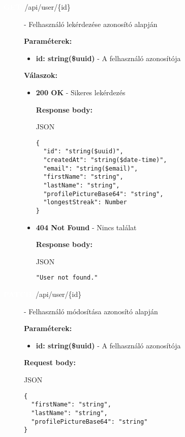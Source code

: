 \documentclass[12pt]{report}
\newcommand{\httpGet}[1]{\colorbox{getColor}{\textbf{\textcolor{white}{GET}}}~#1}
\newcommand{\httpPatch}[1]{\colorbox{patchColor}{\textbf{\textcolor{white}{PATCH}}}~#1}
\begin{document}
\begin{itemize}
\begin{description}
  \item[\httpGet{/api/user/\{id\}}] - Felhasználó lekérdezése azonosító alapján

    \vspace{0.5cm}
    \textbf{Paraméterek:}
    \begin{itemize}
      \item \textbf{id: string(\$uuid)} - A felhasználó azonosítója
    \end{itemize}

    \vspace{0.5cm}
    \textbf{Válaszok:}
    \begin{itemize}
      \item \textbf{200 OK} - Sikeres lekérdezés

        \textbf{Response body:}
        \begin{codeblock}{JSON}
          \begin{verbatim}
{
  "id": "string($uuid)",
  "createdAt": "string($date-time)",
  "email": "string($email)",
  "firstName": "string",
  "lastName": "string",
  "profilePictureBase64": "string",
  "longestStreak": Number
}
          \end{verbatim}
        \end{codeblock}
      \item \textbf{404 Not Found} - Nincs találat

        \textbf{Response body:}
        \begin{codeblock}{JSON}
          \begin{verbatim}
"User not found."
          \end{verbatim}
        \end{codeblock}
    \end{itemize}

    \item[\httpPatch{/api/user/\{id\}}] - Felhasználó módosítása azonosító alapján

    \vspace{0.5cm}
    \textbf{Paraméterek:}
    \begin{itemize}
      \item \textbf{id: string(\$uuid)} - A felhasználó azonosítója
    \end{itemize}

    \vspace{0.5cm}
    \textbf{Request body:}
    \begin{codeblock}{JSON}
      \begin{verbatim}
{
  "firstName": "string",
  "lastName": "string",
  "profilePictureBase64": "string"
}
      \end{verbatim}
    \end{codeblock}


\end{description}
\end{itemize}
\end{document}
